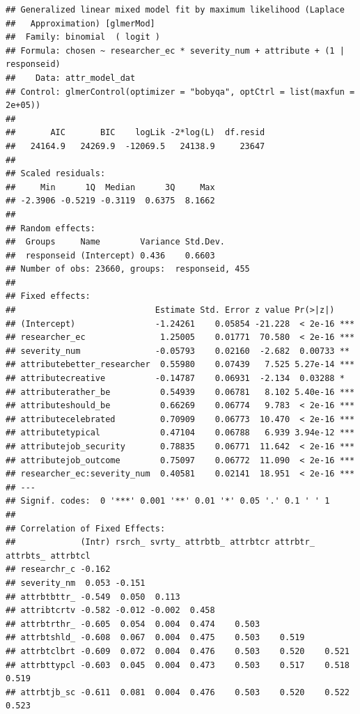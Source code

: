 \documentclass[
]{article}
\begin{document}
\begin{verbatim}
## Generalized linear mixed model fit by maximum likelihood (Laplace
##   Approximation) [glmerMod]
##  Family: binomial  ( logit )
## Formula: chosen ~ researcher_ec * severity_num + attribute + (1 | responseid)
##    Data: attr_model_dat
## Control: glmerControl(optimizer = "bobyqa", optCtrl = list(maxfun = 2e+05))
## 
##       AIC       BIC    logLik -2*log(L)  df.resid 
##   24164.9   24269.9  -12069.5   24138.9     23647 
## 
## Scaled residuals: 
##     Min      1Q  Median      3Q     Max 
## -2.3906 -0.5219 -0.3119  0.6375  8.1662 
## 
## Random effects:
##  Groups     Name        Variance Std.Dev.
##  responseid (Intercept) 0.436    0.6603  
## Number of obs: 23660, groups:  responseid, 455
## 
## Fixed effects:
##                            Estimate Std. Error z value Pr(>|z|)    
## (Intercept)                -1.24261    0.05854 -21.228  < 2e-16 ***
## researcher_ec               1.25005    0.01771  70.580  < 2e-16 ***
## severity_num               -0.05793    0.02160  -2.682  0.00733 ** 
## attributebetter_researcher  0.55980    0.07439   7.525 5.27e-14 ***
## attributecreative          -0.14787    0.06931  -2.134  0.03288 *  
## attributerather_be          0.54939    0.06781   8.102 5.40e-16 ***
## attributeshould_be          0.66269    0.06774   9.783  < 2e-16 ***
## attributecelebrated         0.70909    0.06773  10.470  < 2e-16 ***
## attributetypical            0.47104    0.06788   6.939 3.94e-12 ***
## attributejob_security       0.78835    0.06771  11.642  < 2e-16 ***
## attributejob_outcome        0.75097    0.06772  11.090  < 2e-16 ***
## researcher_ec:severity_num  0.40581    0.02141  18.951  < 2e-16 ***
## ---
## Signif. codes:  0 '***' 0.001 '**' 0.01 '*' 0.05 '.' 0.1 ' ' 1
## 
## Correlation of Fixed Effects:
##             (Intr) rsrch_ svrty_ attrbtb_ attrbtcr attrbtr_ attrbts_ attrbtcl
## researchr_c -0.162                                                           
## severity_nm  0.053 -0.151                                                    
## attrbtbttr_ -0.549  0.050  0.113                                             
## attribtcrtv -0.582 -0.012 -0.002  0.458                                      
## attrbtrthr_ -0.605  0.054  0.004  0.474    0.503                             
## attrbtshld_ -0.608  0.067  0.004  0.475    0.503    0.519                    
## attrbtclbrt -0.609  0.072  0.004  0.476    0.503    0.520    0.521           
## attrbttypcl -0.603  0.045  0.004  0.473    0.503    0.517    0.518    0.519  
## attrbtjb_sc -0.611  0.081  0.004  0.476    0.503    0.520    0.522    0.523  

\end{verbatim}
\end{document}

